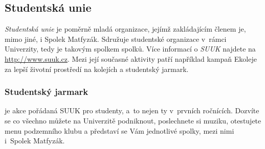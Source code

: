 \subsection{Studentská unie}

{\it Studentská unie\/} je poměrně mladá organizace, jejímž
zakládajícím členem je, mimo jiné, i Spolek Matfyzák. Sdružuje
studentské organizace v~rámci Univerzity, tedy je takovým spolkem
spolků. Více informací o {\it SUUK} najdete na \url{http://www.suuk.cz}.
Mezi její současné aktivity patří například kampaň Ekoleje za
lepší životní prostředí na kolejích a studentský jarmark.

\subsubsection{Studentský jarmark} je akce pořádaná SUUK pro studenty,
a~to nejen ty v~prvních ročnících. Dozvíte se co všechno můžete na
Univerzitě podniknout, poslechnete si muziku, otestujete menu
podzemního klubu a představí se Vám jednotlivé spolky, mezi nimi
i~Spolek Matfyzák.